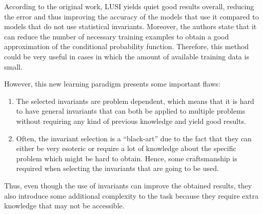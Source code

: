 According to the original work, LUSI yields quiet good results overall, reducing the error and thus improving
the accuracy of the models that use it compared to models that do not use statistical invariants. Moreover,
the authors state that it can reduce the number of necessary training examples to obtain a good approximation
of the conditional probability function. Therefore, this method could be very useful in cases in which the
amount of available training data is small.

However, this new learning paradigm presents some important flaws:

\begin{enumerate}
    \item The selected invariants are problem dependent, which means that it is hard to have general invariants
    that can both be applied to multiple problems without requiring any kind of previous knowledge
    and yield good results.
    \item Often, the invariant selection is a ``black-art'' due to the fact that they can either be
    very esoteric or require a lot of knowledge about the specific problem which might be hard
    to obtain. Hence, some craftsmanship is required when selecting the invariants that are going
    to be used.
\end{enumerate}

Thus, even though the use of invariants can improve the obtained results, they also introduce some additional
complexity to the task because they require extra knowledge that may not be accessible.
